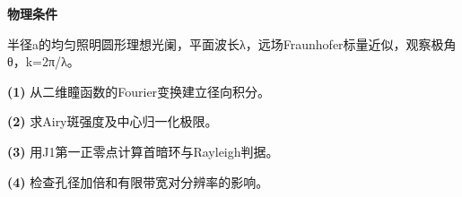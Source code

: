 \textbf{物理条件}\par 半径a的均匀照明圆形理想光阑，平面波长λ，远场Fraunhofer标量近似，观察极角θ，k=2π/λ。
\par\noindent\textbf{(1)} 从二维瞳函数的Fourier变换建立径向积分。
\par\noindent\textbf{(2)} 求Airy斑强度及中心归一化极限。
\par\noindent\textbf{(3)} 用J1第一正零点计算首暗环与Rayleigh判据。
\par\noindent\textbf{(4)} 检查孔径加倍和有限带宽对分辨率的影响。
